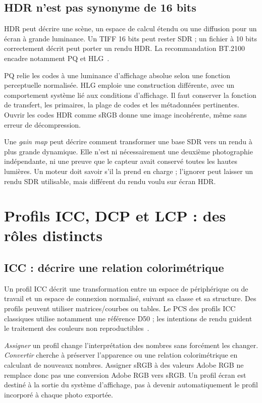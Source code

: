 \subsection{HDR n'est pas synonyme de 16 bits}
HDR peut décrire une scène, un espace de calcul étendu ou
une diffusion pour un écran à grande luminance. Un TIFF
16 bits peut rester SDR ; un fichier à 10 bits correctement
décrit peut porter un rendu HDR. La recommandation
BT.2100 encadre notamment PQ et HLG~\cite{hdr}.

PQ relie les codes à une luminance d'affichage absolue selon
une fonction perceptuelle normalisée. HLG emploie une
construction différente, avec un comportement système lié
aux conditions d'affichage. Il faut conserver la fonction
de transfert, les primaires, la plage de codes et les
métadonnées pertinentes. Ouvrir les codes HDR comme sRGB
donne une image incohérente, même sans erreur de décompression.

Une \emph{gain map} peut décrire comment transformer une
base SDR vers un rendu à plus grande dynamique. Elle n'est
ni nécessairement une deuxième photographie indépendante,
ni une preuve que le capteur avait conservé toutes les
hautes lumières. Un moteur doit savoir s'il la prend en
charge ; l'ignorer peut laisser un rendu SDR utilisable,
mais différent du rendu voulu sur écran HDR.

\section{Profils ICC, DCP et LCP : des rôles distincts}
\subsection{ICC : décrire une relation colorimétrique}
Un profil ICC décrit une transformation entre un espace
de périphérique ou de travail et un espace de connexion
normalisé, suivant sa classe et sa structure. Des profils
peuvent utiliser matrices/courbes ou tables. Le PCS des
profils ICC classiques utilise notamment une référence D50 ;
les intentions de rendu guident le traitement des couleurs
non reproductibles~\cite{iccimages}.

\emph{Assigner} un profil change l'interprétation des nombres
sans forcément les changer. \emph{Convertir} cherche à
préserver l'apparence ou une relation colorimétrique en
calculant de nouveaux nombres. Assigner sRGB à des valeurs
Adobe RGB ne remplace donc pas une conversion Adobe RGB
vers sRGB. Un profil écran est destiné à la sortie du
système d'affichage, pas à devenir automatiquement le
profil incorporé à chaque photo exportée.

